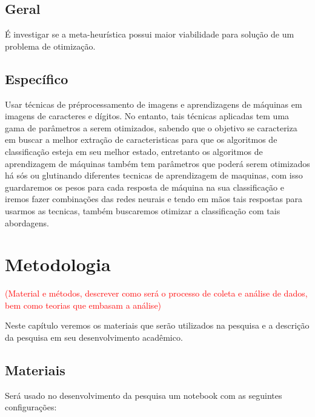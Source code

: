 \documentclass[12pt,a4paper,oneside]{book}
\newcommand\wb[1]{\discretionary{#1}{#1}{#1}}
\begin{document}
\section{Geral}
\'{E} investigar se a meta-heur\'{i}stica possui maior viabilidade para
solu\c{c}\~{a}o de um problema de otimiza\c{c}\~{a}o.
\section{Espec\'{i}fico}
Usar t\'{e}cnicas de pr\'{e}\wb-processamento de imagens e aprendizagens de
m\'{a}quinas em imagens de caracteres e d\'{i}gitos. No entanto, tais
t\'{e}cnicas aplicadas tem uma gama de par\^{a}metros a serem otimizados,
sabendo que o objetivo se caracteriza em buscar a melhor extra\c{c}\~{a}o de
caracteristicas para que os algoritmos de classifica\c{c}\~{a}o esteja em seu
melhor estado, entretanto os algoritmos de aprendizagem de m\'{a}quinas
tamb\'{e}m tem par\^{a}metros que poder\'{a} serem otimizados h\'{a} s\'{o}s ou
glutinando diferentes tecnicas de aprendizagem de maquinas, com isso guardaremos
os pesos para cada resposta de m\'{a}quina na sua classifica\c{c}\~{a}o e iremos
fazer combina\c{c}\~{o}es das redes neurais e tendo em m\~{a}os tais respostas
para usarmos as tecnicas, tamb\'{e}m buscaremos otimizar a classifica\c{c}\~{a}o
com tais abordagens.
\pagebreak
\chapter{Metodologia}
\textcolor{red}{(Material e m\'{e}todos, descrever como ser\'{a} o processo de
coleta e an\'{a}lise de dados, bem como teorias que embasam a an\'{a}lise)}

Neste cap\'{i}tulo veremos os materiais que ser\~{a}o utilizados na pesquisa e a
descri\c{c}\~{a}o da pesquisa em seu desenvolvimento acad\^{e}mico.
\section{Materiais}
\noindent
Ser\'{a} usado no desenvolvimento da pesquisa um notebook com as seguintes configura\c{c}\~{o}es:
\end{document}
